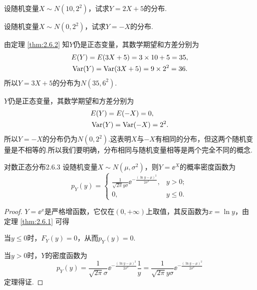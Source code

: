 \begin{example}
  \begin{inparaenum}[(1)]
    \item 设随机变量$X\sim N(10,2^2)$，试求$Y=2X+5$的分布.

    \item 设随机变量$X\sim N(0,2^2)$，试求$Y=-X$的分布.
  \end{inparaenum}
\end{example}

\begin{solution}
  \begin{inparaenum}[(1)]
    由定理 \ref{thm:2.6.2} 知$Y$仍是正态变量，其数学期望和方差分别为
    \begin{align*}
      & E(Y) = E(3X + 5) = 3\times10 + 5 =35, \\
      & \operatorname{Var}(Y) = \operatorname{Var}( 3X + 5) = 9 \times 2^2 = 36.
    \end{align*}
    所以$Y=3X+5$的分布为$N(35,6^2)$.

    \item $Y$仍是正态变量，其数学期望和方差分别为
    \begin{align*}
      & E(Y) = E(-X) = 0 , \\
      & \operatorname{Var}(Y) = \operatorname{Var}(-X) = 2^2.
    \end{align*}
    所以$Y=-X$的分布仍为$N(0,2^2)$.这表明$X$与$-X$有相同的分布，但这两个随机变量是不相等的.所以我们要明确，分布相同与随机变量相等是两个完全不同的概念.
  \end{inparaenum}
\end{solution}

\begin{theorem}{对数正态分布}{2.6.3}
  设随机变量$X\sim N(\mu,\sigma^2)$，则$Y=\ee^X$的概率密度函数为
  \begin{equation}\label{eq2.6.2}
    p_Y(y) = \begin{cases}
      \frac1{\sqrt{2\pi}y\sigma} \ee^{-\frac{(\ln y-\mu)^2}{2\sigma^2}}, & y > 0; \\
      0, & y \le 0.
    \end{cases}
  \end{equation}
\end{theorem}
\begin{proof}
  $Y=\ee^x$是严格增函数，它仅在$(0,+\infty)$上取值，其反函数为$x=\ln y$，由定理 \ref{thm:2.6.1} 可得

  当$y\le0$时，$F_Y(y)=0$，从而$p_Y(y)=0$.

  当$y>0$时，$Y$的密度函数为
  \[
    p_Y(y) = \frac1{\sqrt{2\pi}\sigma}\ee^{-\frac{(\ln y-\mu)^2}{2\sigma^2}}\frac1y = \frac1{\sqrt{2\pi}y\sigma}\ee^{-\frac{(\ln y-\mu)^2}{2\sigma^2}}
  \]
  定理得证.
\end{proof}

